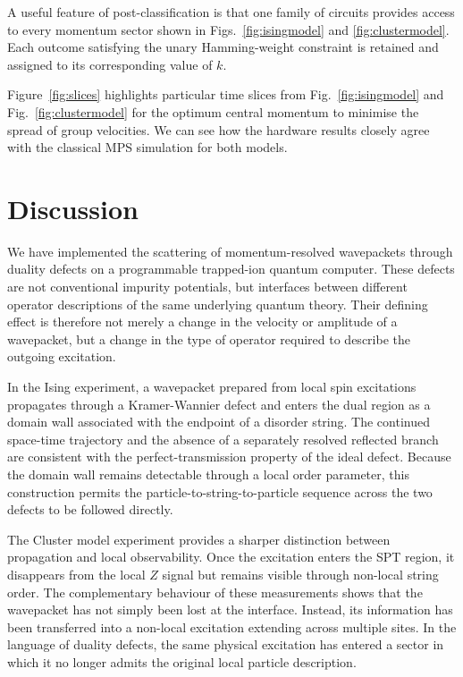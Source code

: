 A useful feature of post-classification is that one family of circuits provides access to every momentum sector shown in Figs.~\ref{fig:isingmodel} and \ref{fig:clustermodel}. Each outcome satisfying the unary Hamming-weight constraint is retained and assigned to its corresponding value of $k$. 

Figure~\ref{fig:slices} highlights particular time slices from Fig.~\ref{fig:isingmodel} and Fig.~\ref{fig:clustermodel} for the optimum central momentum to minimise the spread of group velocities. We can see how the hardware results closely agree with the classical MPS simulation for both models.


\section{Discussion}

We have implemented the scattering of momentum-resolved wavepackets through duality defects on a programmable trapped-ion quantum computer. These defects are not conventional impurity potentials, but interfaces between different operator descriptions of the same underlying quantum theory. Their defining effect is therefore not merely a change in the velocity or amplitude of a wavepacket, but a change in the type of operator required to describe the outgoing excitation.

In the Ising experiment, a wavepacket prepared from local spin excitations propagates through a Kramer-Wannier defect and enters the dual region as a domain wall associated with the endpoint of a disorder string. The continued space-time trajectory and the absence of a separately resolved reflected branch are consistent with the perfect-transmission property of the ideal defect. Because the domain wall remains detectable through a local order parameter, this construction permits the particle-to-string-to-particle sequence across the two defects to be followed directly.

The Cluster model experiment provides a sharper distinction between propagation and local observability. Once the excitation enters the SPT region, it disappears from the local $Z$ signal but remains visible through non-local string order. The complementary behaviour of these measurements shows that the wavepacket has not simply been lost at the interface. Instead, its information has been transferred into a non-local excitation extending across multiple sites. In the language of duality defects, the same physical excitation has entered a sector in which it no longer admits the original local particle description.

